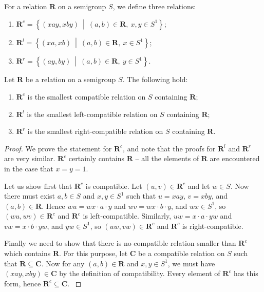 \begin{definition}
  \label{def:rc}
  For a relation $\mathbf{R}$ on a semigroup $S$, we define three relations:
  \begin{enumerate}[\rm(i)]
  \item
    $\mathbf{R}^c = \left\{(xay, xby) ~\middle|~ (a,b) \in \mathbf{R},~x,y \in
      S^1\right\}$;
  \item
    $\mathbf{R}^l = \left\{(xa, xb) ~\middle|~ (a,b) \in \mathbf{R},~x \in
      S^1\right\}$;
  \item
    $\mathbf{R}^r = \left\{(ay, by) ~\middle|~ (a,b) \in \mathbf{R},~y \in
      S^1\right\}$.
  \end{enumerate}
\end{definition}

\begin{lemma}
  \label{lem:rc}
  Let $\mathbf{R}$ be a relation on a semigroup $S$.
  The following hold:
  \begin{enumerate}[\rm(i)]
  \item $\mathbf{R}^c$ is the smallest compatible relation on $S$ containing
    $\mathbf{R}$;
  \item $\mathbf{R}^l$ is the smallest left-compatible relation on $S$
    containing $\mathbf{R}$;
  \item $\mathbf{R}^r$ is the smallest right-compatible relation on $S$
    containing $\mathbf{R}$.
  \end{enumerate}
  \begin{proof}
    We prove the statement for $\mathbf{R}^c$, and note that the proofs for
    $\mathbf{R}^l$ and $\mathbf{R}^r$ are very similar.
    $\mathbf{R}^c$ certainly contains $\mathbf{R}$ -- all the elements of
    $\mathbf{R}$ are encountered in the case that $x=y=1$.

    Let us show first that $\mathbf{R}^c$ is compatible.
    Let $(u,v) \in \mathbf{R}^c$ and let $w \in S$.  Now there must exist $a,b
    \in S$ and $x,y \in S^1$ such that $u=xay$, $v=xby$, and $(a,b) \in
    \mathbf{R}$.  Hence
    $wu = wx \cdot a \cdot y$ and
    $wv = wx \cdot b \cdot y$, and $wx \in S^1$,
    so $(wu,wv) \in \mathbf{R}^c$ and $\mathbf{R}^c$ is left-compatible.
    Similarly,
    $uw = x \cdot a \cdot yw$ and
    $vw = x \cdot b \cdot yw$, and $yw \in S^1$,
    so $(uw,vw) \in \mathbf{R}^c$ and $\mathbf{R}^c$ is right-compatible.

    Finally we need to show that there is no compatible relation smaller than
    $\mathbf{R}^c$ which contains $\mathbf{R}$.  For this purpose, let
    $\mathbf{C}$ be a compatible relation on $S$ such that $\mathbf{R} \subseteq
    \mathbf{C}$.  Now for any $(a,b) \in \mathbf{R}$ and $x,y \in S^1$, we must
    have $(xay,xby) \in \mathbf{C}$ by the definition of compatibility.  Every
    element of $\mathbf{R}^c$ has this form, hence $\mathbf{R}^c \subseteq
    \mathbf{C}$. \cite[\S1.5]{howie}
  \end{proof}
\end{lemma}

